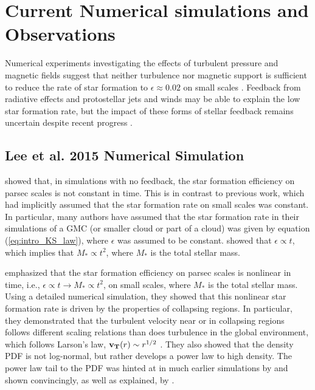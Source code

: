 \documentclass[../dissertation.tex]{subfiles}
\begin{document}
\section{Current Numerical simulations and Observations} \label{current_obs}
Numerical experiments investigating the effects of turbulent pressure and magnetic fields suggest that neither turbulence nor magnetic support is sufficient 
to reduce the rate of star formation to $\epsilon\approx 0.02$ on small scales
\citep{2010ApJ...709...27W,2011MNRAS.410L...8C,2011ApJ...730...40P,2012ApJ...754...71K,2014MNRAS.439.3420M}. 
Feedback from radiative effects and protostellar jets and winds may be able to explain the low star formation rate, 
but the impact of these forms of stellar feedback remains uncertain despite recent progress
\citep{2010ApJ...709...27W,2014MNRAS.439.3420M,2015MNRAS.450.4035F}.




\subsection{Lee et al. 2015 Numerical Simulation} \label{Lee15_model}

\citet{2015ApJ...800...49L} showed that, in simulations with no feedback, the star formation efficiency on
parsec scales is not constant in time.
This is in contrast to previous work, which had implicitly assumed that the star formation rate on small scales was constant.
In particular, many authors have assumed that the star formation rate in their simulations of a GMC (or smaller cloud or part of a cloud) was given by equation (\ref{eq:intro_KS_law}), where $\epsilon$ was assumed to be constant.
\citet{2015ApJ...800...49L} showed that $\epsilon \propto t$, which implies that $M_* \propto t^2$, where $M_*$ is the total stellar mass.

\citet{2015ApJ...800...49L} emphasized that the star formation efficiency on 
parsec scales is nonlinear 
in time, i.e., $\epsilon \propto t \rightarrow M_* \propto t^2$, on small scales, where $M_*$ is the total stellar mass. 
Using a detailed numerical simulation, they showed that this nonlinear star formation 
rate is driven by the properties of collapsing regions.
In particular, they demonstrated that the turbulent velocity near or in collapsing regions follows 
different scaling relations than does turbulence in the global environment, which follows
Larson's law, $\mathbf{v_T} (r)\sim r^{1/2}$ \citep{1981MNRAS.194..809L}. 
They also showed that the density PDF 
is not log-normal, but rather develops a power law to high density.
The power law tail to the  PDF  was hinted at in much earlier simulations by \citet{2000ApJ...535..869K} and shown convincingly, 
as well as explained, by \citet{2011ApJ...727L..20K}. 
\end{document}
